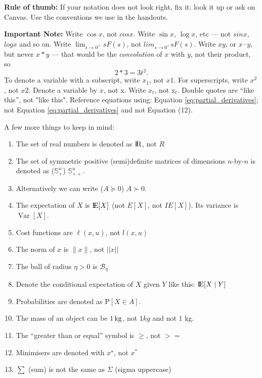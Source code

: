 \documentclass[a4paper,11pt,reqno]{amsart}
\newcommand{\R}{{\rm I\!R}}
\newcommand{\E}{{\rm I\!E}}
\DeclareMathOperator{\Var}{Var}
\newcommand{\smallplus}{{\scriptscriptstyle +}}
\newcommand{\Spp}{\mathbb{S}_{\smallplus\smallplus}}
\newcommand{\Sp}{\mathbb{S}_{\smallplus}}
\newcommand{\prob}{\mathrm{P}}
\begin{document}
\noindent \textbf{Rule of thumb:} If your notation does not look right, fix it: look it up or ask on Canvas.  Use the conventions we use in the handouts.

\begin{tcolorbox}[title={Common typesetting mistakes}]
    \textbf{Important Note:}
    Write $\cos x$, not $cos x$.
    Write $\sin x$, $\log x$, etc --- not $sin x$, $log x$ and so on.
    Write $\lim_{s\to 0^+} sF(s)$, not $lim_{s\to 0^+} sF(s)$.
    Write $xy$,  or $x\cdot y$,  but never $x*y$ --- that would be the \textit{convolution} of $x$ with $y$,  not their product,  so
    \begin{equation}
        2 * 3 = 3t^2.
    \end{equation}
    To denote a variable with a subscript, write $x_1$, not $x1$.
    For superscripts, write $x^2$, not $x2$.
    Denote a variable by $x$, not x.
    Write $x_t$, not x$_t$.
    Double quotes are ``like this'',  not "like this".
    Reference equations using: Equation \eqref{eq:partial_derivatives};
    not Equation \ref{eq:partial_derivatives} and not Equation (12).
\end{tcolorbox}

\begin{tcolorbox}[title={Additional typesetting mistakes}]
    A few more things to keep in mind:
    \begin{enumerate}
        \item The set of real numbers is denoted as $\R$, not $R$
        \item The set of symmetric positive (semi)definite matrices of dimensions $n$-by-$n$ is denoted as ($\Sp^n$) $\Spp^n$.
        \item Alternatively we can write ($A \succcurlyeq 0$) $A \succ 0$.
        \item The expectation of $X$ is $\E[X]$ (not $E[X]$, not $IE[X]$). Its variance is $\Var[X]$.
        \item Cost functions are $\ell(x, u)$, not $l(x, u)$
        \item The norm of $x$ is $\|x\|$, not $||x||$
        \item The ball of radius $\eta>0$ is $\mathcal{B}_\eta$
        \item Denote the conditional expectation of $X$ given $Y$ like this: $\E[X {}\mid{} Y]$
        \item Probabilities are denoted as $\prob[X \in A]$.
        \item The mass of an object can be $\unit[1]{kg}$, not $1kg$ and not $1$ kg.
        \item The ``greater than or equal'' symbol is $\geq$, not $>=$
        \item Minimisers are denoted with $x^\star$, not $x^*$
        \item $\sum$ (sum) is not the same as $\Sigma$ (sigma uppercase)
    \end{enumerate}
\end{tcolorbox}
\end{document}
